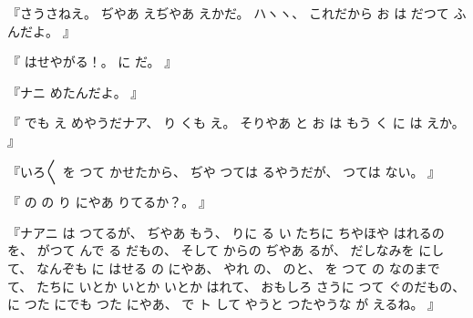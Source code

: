 %
『さうさねえ。
%
ぢやあ
えぢやあ
えかだ。
%
ハヽヽ、
%
これだから
お
は
だつて
ふんだよ。
』

%
『
はせやがる！。
%
に
だ。
』

%
『ナニ
めたんだよ。
』

%
『
でも
え
めやうだナア、
%
り
くも
え。
%
そりやあ
と
お
は
もう
く
に
は
えか。
』

%
『いろ〳〵
を
つて
かせたから、
%
ぢや
つては
るやうだが、
%
つては
ない。
』

%
『
の
の
り
にやあ
りてるか？。
』

%
『ナアニ
は
つてるが、
%
ぢやあ
もう、
%
りに
る
い
たちに
ちやほや
はれるのを、
%
がつて
んで
る
だもの、
%
そして
からの
ぢやあ
るが、
%
だしなみを
にして、
%
なんぞも
に
はせる
の
にやあ、
%
やれ
の、
%
のと、
%
%
を
つて
の
なのまで
て、
%
たちに
いとか
いとか
いとか
はれて、
%
おもしろ
さうに
つて
ぐのだもの、
%
%
に
つた
にでも
つた
にやあ、
%
で
ト
して
やうと
つたやうな
が
えるね。
』

